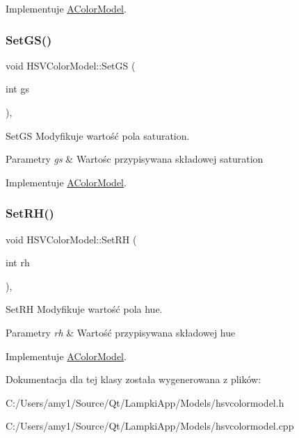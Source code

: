 Implementuje \mbox{\hyperlink{class_a_color_model}{A\+Color\+Model}}.

\mbox{\label{class_h_s_v_color_model_a3478cc455994e6b0737391e083f1666a}} 
\subsubsection{\texorpdfstring{Set\+G\+S()}{SetGS()}}
{\footnotesize\ttfamily void H\+S\+V\+Color\+Model\+::\+Set\+GS (\begin{DoxyParamCaption}\item[{int}]{gs }\end{DoxyParamCaption})\hspace{0.3cm}{\ttfamily [override]}, {\ttfamily [virtual]}}



Set\+GS Modyfikuje wartość pola saturation. 


\begin{DoxyParams}{Parametry}
{\em gs} & Wartośc przypisywana składowej saturation \\
\hline
\end{DoxyParams}


Implementuje \mbox{\hyperlink{class_a_color_model}{A\+Color\+Model}}.

\mbox{\label{class_h_s_v_color_model_ae451a6fb2bd74cea52f96810e0140d46}} 
\subsubsection{\texorpdfstring{Set\+R\+H()}{SetRH()}}
{\footnotesize\ttfamily void H\+S\+V\+Color\+Model\+::\+Set\+RH (\begin{DoxyParamCaption}\item[{int}]{rh }\end{DoxyParamCaption})\hspace{0.3cm}{\ttfamily [override]}, {\ttfamily [virtual]}}



Set\+RH Modyfikuje wartość pola hue. 


\begin{DoxyParams}{Parametry}
{\em rh} & Wartość przypisywana składowej hue \\
\hline
\end{DoxyParams}


Implementuje \mbox{\hyperlink{class_a_color_model}{A\+Color\+Model}}.



Dokumentacja dla tej klasy została wygenerowana z plików\+:\begin{DoxyCompactItemize}
\item 
C\+:/\+Users/amy1/\+Source/\+Qt/\+Lampki\+App/\+Models/hsvcolormodel.\+h\item 
C\+:/\+Users/amy1/\+Source/\+Qt/\+Lampki\+App/\+Models/hsvcolormodel.\+cpp\end{DoxyCompactItemize}
